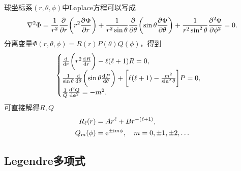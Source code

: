 球坐标系$(r,\theta,\phi)$中Laplace方程可以写成
\begin{equation}
    \label{eqn:Laplace in spherical}
    \lap\Phi=\frac1{r^2}\pp r\biggkh{r^2\pv\Phi r}+\frac1{r^2\sin\theta}\pp\theta\biggkh{\sin\theta\pv\Phi\theta}+\frac1{r^2\sin^2\theta}\pv[2]\Phi\phi=0.
\end{equation}
分离变量$\Phi(r,\theta,\phi)=R(r)P(\theta)Q(\phi)$，得到 
\[
    \begin{cases}
        \dd r\biggkh{r^2\dv Rr}-\ell(\ell+1)R=0,\\
        \frac1{\sin\theta}\dd\theta\biggkh{\sin\theta\dv P\theta}+\biggfkh{\ell(\ell+1)-\frac{m^2}{\sin^2\theta}}P=0,\\
        \frac1Q\dv[2]Q\phi=-m^2.
    \end{cases}
\]
可直接解得$R,Q$
\begin{align}
    R_\ell(r)&=Ar^\ell+Br^{-(\ell+1)},\\
    Q_m(\phi)&=\e{\pm\i m\phi},\quad m=0,\pm 1,\pm 2,\ldots
\end{align}

\subsection{Legendre多项式}
\label{ssec:Legendre polynomial}

